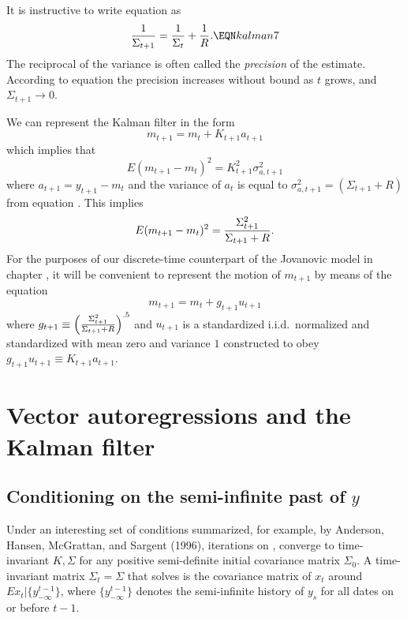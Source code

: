   It is instructive to write equation  as
$$ {1 \over \Sigma_{t+1}} = {1  \over \Sigma_t} + {1 \over R}. \EQN kalman7 $$
The reciprocal of the variance is often called the
{\it precision\/} of the estimate.  According to equation
 the precision  increases
without bound as $t$ grows, and $\Sigma_{t+1} \rightarrow 0$.

   We can represent the Kalman filter in the form %
$$  m_{t+1} = m_t + K_{t+1} a_{t+1} $$
which implies that
$$ E(m_{t+1} -m_t)^2 =  K_{t+1}^2 \sigma_{a,t+1}^2 $$
where $a_{t+1} = y_{t+1} - m_t$ and the variance
of $a_t$ is equal to
$\sigma_{a,t+1}^2 = (\Sigma_{t+1} +R)$ from equation
 .  This implies
$$ E(m_{t+1} - m_t)^2 = {\Sigma_{t+1}^2 \over \Sigma_{t+1}+R }. $$
For the purposes of our discrete-time counterpart of the Jovanovic
model in chapter , it will be
convenient to represent the motion
of $m_{t+1}$ by means of the equation
$$ m_{t+1} = m_t + g_{t+1} u_{t+1} $$
where $g_{t+1} \equiv \left({\Sigma_{t+1}^2 \over
\Sigma_{t+1} + R }\right)^{.5}$ and $u_{t+1}$
is a standardized i.i.d.\ normalized and standardized with
mean zero  and variance $1$
constructed to obey  $g_{t+1} u_{t+1} \equiv  K_{t+1} a_{t+1} $.


\section{Vector autoregressions and the Kalman filter}\label{sec:VAR}%
\subsection{Conditioning on the semi-infinite past of $y$}
Under an interesting set of conditions summarized, for example, by
Anderson, Hansen, McGrattan, and Sargent (1996), iterations on ,  converge to time-invariant
$K, \Sigma$ for any positive semi-definite initial covariance matrix $\Sigma_0$.
A time-invariant matrix $\Sigma_t=\Sigma$ that solves  is the covariance matrix
of $x_t$ around $E x_t | \{y^{t-1}_{-\infty}\} $, where $\{y^{t-1}_{-\infty}\}$ denotes the semi-infinite
history of $y_s$ for all dates on or before $t-1$.
%

